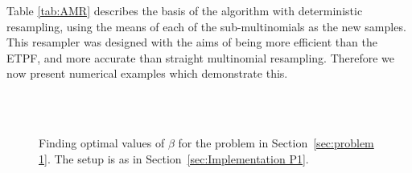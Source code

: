 \documentclass[final]{siamltex}
\begin{document}
Table \ref{tab:AMR} describes the basis of the algorithm with
deterministic resampling, using the means of each of the
sub-multinomials as the new samples. This resampler was designed with the aims of being
more efficient than the ETPF, and more accurate than straight multinomial
resampling. Therefore we now present numerical examples which
demonstrate this.

\begin{figure}[htb]
\centering
{}
\\
\\
\caption{Finding optimal values of $\beta$ for the problem in Section~\ref{sec:problem 1}. The setup is as in Section~\ref{sec:Implementation P1}.}
\label{fig:AMR}
\end{figure}
\end{document}
